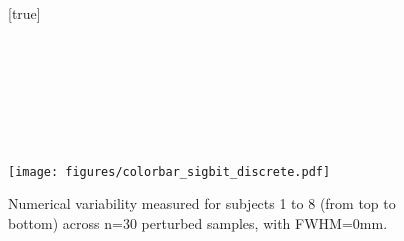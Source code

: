 \documentclass[lettersize,journal]{IEEEtran}
\begin{document}


\begin{landscape}
    \begin{figure}
        \vspace*{-2cm}
        \centering
        [true] \\
         \\
         \\
         \\
         \\
         \\
         \\
         \\
        \texttt{[image: figures/colorbar\_sigbit\_discrete.pdf]}
        \caption{Numerical variability measured for subjects 1 to 8 (from top to bottom) across n=30 perturbed samples, with FWHM=0mm. }
        \label{fig:uncertainty-maps-0mm-disc}
    \end{figure}
\end{landscape}
\end{document}
